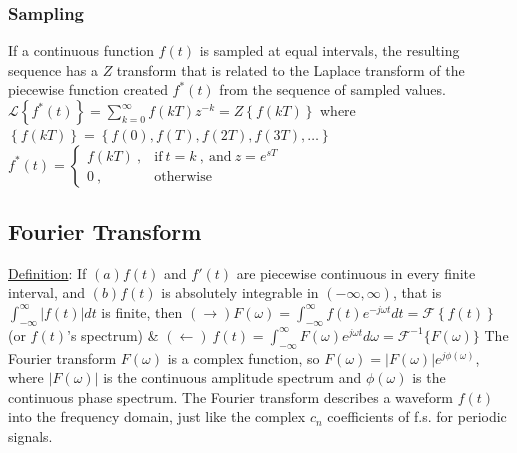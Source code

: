 \documentclass[12pt]{article}
\begin{document}
\begin{flushleft}
	\subsubsection{Sampling} 
	
	If a continuous function $f(t)$ is sampled at equal intervals, the resulting sequence has a $Z$ transform that is related to the Laplace transform of the piecewise function created $f^*(t)$ from the sequence of sampled values. \linebreak 
	$\displaystyle \mathcal{L} \left\{ f^*(t) \right\} = \sum \limits_{k=0}^{\infty} f(kT) z^{-k} = Z \left\{ f(kT) \right\}$ \linebreak 
	where $\displaystyle \left\{ f(kT) \right\} = \left\{ f(0), f(T), f(2T), f(3T), \ldots \right\} $ \linebreak 
	$\displaystyle f^* (t) = 	\begin{cases} 
											f(kT) \ , & \text{if} \ t=k \ , \ \text{and} \ z=e^{sT} \\ 
											0 \ , & \text{otherwise} 
										\end{cases} $ \linebreak 
	
	\subsection{Fourier Transform}
	
	\textbullet \quad \uline{Definition}: If \linebreak 
	$(a) f(t)$ and $f'(t)$ are piecewise continuous in every finite interval, and 
	$(b) f(t)$ is absolutely integrable in $(-\infty, \infty )$, that is $\int_{-\infty}^{\infty} |f(t)| dt$ is finite, then \linebreak 
	$\displaystyle (\rightarrow) F(\omega) = \int_{-\infty}^{\infty} f(t) e^{-j\omega t} dt = \mathcal{F} \left\{ f(t) \right\}$ (or $f(t)$'s spectrum) \& $\displaystyle (\leftarrow) \ f(t) = \int_{-\infty}^{\infty} F(\omega) e^{j\omega t} d\omega = \mathcal{F}^{-1} \{ F(\omega)\}$ \linebreak 
	\textbullet \quad The Fourier transform $F(\omega)$ is a complex function, so $\displaystyle F(\omega) = \left| F(\omega) \right| e^{j\phi (\omega)}$, where $\displaystyle \left| F(\omega) \right|$ is the continuous amplitude spectrum and $\phi (\omega)$ is the continuous phase spectrum. \linebreak 
	\textbullet \quad The Fourier transform describes a waveform $f(t)$ into the frequency domain, just like the complex $c_n$ coefficients of f.s. for periodic signals. \linebreak 
	

\end{flushleft}
\end{document}
